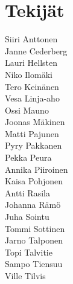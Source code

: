 \chapter{Tekijät}

Siiri Anttonen \\
Janne Cederberg \\
Lauri Hellsten\\
Niko Ilomäki\\
Tero Keinänen\\
Vesa Linja-aho\\
Ossi Mauno\\
Joonas Mäkinen\\
Matti Pajunen\\
Pyry Pakkanen\\
Pekka Peura\\
Annika Piiroinen\\
Kaisa Pohjonen\\
Antti Rasila\\
Johanna Rämö\\
Juha Sointu\\
Tommi Sottinen\\
Jarno Talponen\\
Topi Talvitie\\
Sampo Tiensuu\\
Ville Tilvis
